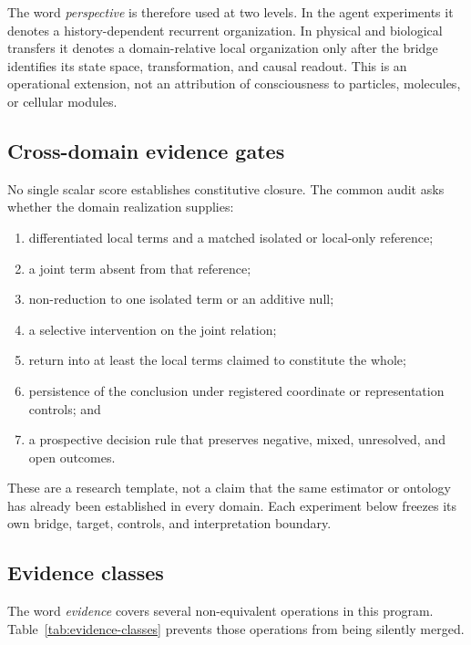 \documentclass[11pt,a4paper]{article}
\begin{document}
The word \emph{perspective} is therefore used at two levels. In the agent experiments it denotes a history-dependent recurrent organization. In physical and biological transfers it denotes a domain-relative local organization only after the bridge identifies its state space, transformation, and causal readout. This is an operational extension, not an attribution of consciousness to particles, molecules, or cellular modules.

\subsection{Cross-domain evidence gates}

No single scalar score establishes constitutive closure. The common audit asks whether the domain realization supplies:
\begin{enumerate}
  \item differentiated local terms and a matched isolated or local-only reference;
  \item a joint term absent from that reference;
  \item non-reduction to one isolated term or an additive null;
  \item a selective intervention on the joint relation;
  \item return into at least the local terms claimed to constitute the whole;
  \item persistence of the conclusion under registered coordinate or representation controls; and
  \item a prospective decision rule that preserves negative, mixed, unresolved, and open outcomes.
\end{enumerate}
These are a research template, not a claim that the same estimator or ontology has already been established in every domain. Each experiment below freezes its own bridge, target, controls, and interpretation boundary.

\subsection{Evidence classes}

The word \emph{evidence} covers several non-equivalent operations in this program. Table~\ref{tab:evidence-classes} prevents those operations from being silently merged.
\end{document}
